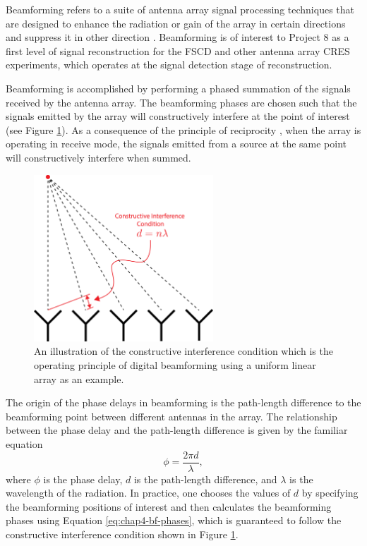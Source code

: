 Beamforming refers to a suite of antenna array signal processing techniques that are designed to enhance the radiation or gain of the array in certain directions and suppress it in other direction \cite{balanis2015antenna}. Beamforming is of interest to Project 8 as a first level of signal reconstruction for the FSCD and other antenna array CRES experiments, which operates at the signal detection stage of reconstruction.%

Beamforming is accomplished by performing a phased summation of the signals received by the antenna array. The beamforming phases are chosen such that the signals emitted by the array will constructively interfere at the point of interest (see Figure \ref{fig:chap4-basic-bf}). As a consequence of the principle of reciprocity \cite{reciprocity_theorem}, when the array is operating in receive mode, the signals emitted from a source at the same point will constructively interfere when summed.  
\begin{figure}[htbp]
    \centering
    \includegraphics[width=0.6\textwidth]{figs/Chapter-4/230517_basic_bf.png}
    \caption{An illustration of the constructive interference condition which is the operating principle of digital beamforming using a uniform linear array as an example.}
    \label{fig:chap4-basic-bf}
\end{figure}
The origin of the phase delays in beamforming is the path-length difference to the beamforming point between different antennas in the array. The relationship between the phase delay and the path-length difference is given by the familiar equation
\begin{equation}
    \phi=\frac{2\pi d}{\lambda},
    \label{eq:chap4-bf-phases}
\end{equation}
where $\phi$ is the phase delay, $d$ is the path-length difference, and $\lambda$ is the wavelength of the radiation. In practice, one chooses the values of $d$ by specifying the beamforming positions of interest and then calculates the beamforming phases using Equation \ref{eq:chap4-bf-phases}, which is guaranteed to follow the constructive interference condition shown in Figure \ref{fig:chap4-basic-bf}. 

